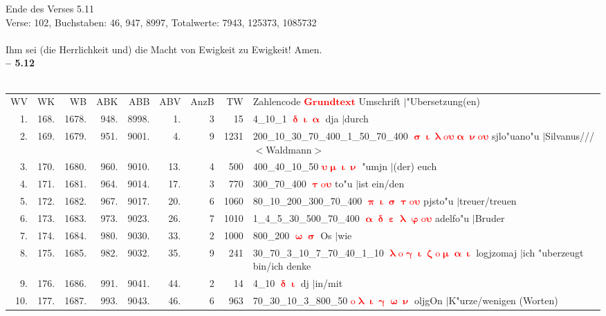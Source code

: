 \documentclass[a4paper,10pt,landscape]{article}
\begin{document}
Ende des Verses 5.11\\
Verse: 102, Buchstaben: 46, 947, 8997, Totalwerte: 7943, 125373, 1085732\\
\\
Ihm sei (die Herrlichkeit und) die Macht von Ewigkeit zu Ewigkeit! Amen.\\
\newpage 
{\bf -- 5.12}\\
\medskip \\
\begin{tabular}{rrrrrrrrp{120mm}}
WV&WK&WB&ABK&ABB&ABV&AnzB&TW&Zahlencode \textcolor{red}{$\boldsymbol{Grundtext}$} Umschrift $|$"Ubersetzung(en)\\
1.&168.&1678.&948.&8998.&1.&3&15&4\_10\_1 \textcolor{red}{$\boldsymbol{\updelta\upiota\upalpha}$} dja $|$durch\\
2.&169.&1679.&951.&9001.&4.&9&1231&200\_10\_30\_70\_400\_1\_50\_70\_400 \textcolor{red}{$\boldsymbol{\upsigma\upiota\uplambda\mathrm{o}\upsilon\upalpha\upnu\mathrm{o}\upsilon}$} sjlo"uano"u $|$Silvanus///$<$Waldmann$>$\\
3.&170.&1680.&960.&9010.&13.&4&500&400\_40\_10\_50 \textcolor{red}{$\boldsymbol{\upsilon\upmu\upiota\upnu}$} "umjn $|$(der) euch\\
4.&171.&1681.&964.&9014.&17.&3&770&300\_70\_400 \textcolor{red}{$\boldsymbol{\uptau\mathrm{o}\upsilon}$} to"u $|$ist ein/den\\
5.&172.&1682.&967.&9017.&20.&6&1060&80\_10\_200\_300\_70\_400 \textcolor{red}{$\boldsymbol{\uppi\upiota\upsigma\uptau\mathrm{o}\upsilon}$} pjsto"u $|$treuer/treuen\\
6.&173.&1683.&973.&9023.&26.&7&1010&1\_4\_5\_30\_500\_70\_400 \textcolor{red}{$\boldsymbol{\upalpha\updelta\upepsilon\uplambda\upvarphi\mathrm{o}\upsilon}$} adelfo"u $|$Bruder\\
7.&174.&1684.&980.&9030.&33.&2&1000&800\_200 \textcolor{red}{$\boldsymbol{\upomega\upsigma}$} Os $|$wie\\
8.&175.&1685.&982.&9032.&35.&9&241&30\_70\_3\_10\_7\_70\_40\_1\_10 \textcolor{red}{$\boldsymbol{\uplambda\mathrm{o}\upgamma\upiota\upzeta\mathrm{o}\upmu\upalpha\upiota}$} logjzomaj $|$ich "uberzeugt bin/ich denke\\
9.&176.&1686.&991.&9041.&44.&2&14&4\_10 \textcolor{red}{$\boldsymbol{\updelta\upiota}$} dj $|$in/mit\\
10.&177.&1687.&993.&9043.&46.&6&963&70\_30\_10\_3\_800\_50 \textcolor{red}{$\boldsymbol{\mathrm{o}\uplambda\upiota\upgamma\upomega\upnu}$} oljgOn $|$K"urze/wenigen (Worten)\\

\end{tabular}
\end{document}
